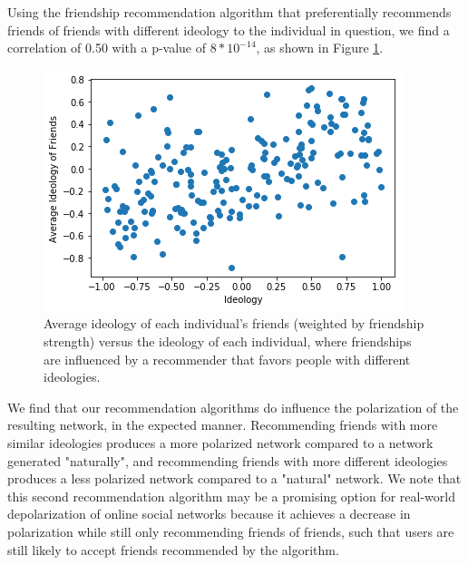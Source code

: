 \documentclass[12pt,letterpaper]{article}
\begin{document}
Using the friendship recommendation algorithm that preferentially recommends friends of friends with different ideology to the individual in question, we find a correlation of 0.50 with a p-value of $8*10^{-14}$, as shown in Figure \ref{fig:depolar}.

\begin{figure}[htbp!]
	\includegraphics[width=\linewidth]{depolar_intervention.png}
	\caption{Average ideology of each individual's friends (weighted by friendship strength) versus the ideology of each individual, where friendships are influenced by a recommender that favors people with different ideologies.}
	\label{fig:depolar}
\end{figure}

We find that our recommendation algorithms do influence the polarization of the resulting network, in the expected manner. Recommending friends with more similar ideologies produces a more polarized network compared to a network generated "naturally", and recommending friends with more different ideologies produces a less polarized network compared to a "natural" network. We note that this second recommendation algorithm may be a promising option for real-world depolarization of online social networks because it achieves a decrease in polarization while still only recommending friends of friends, such that users are still likely to accept friends recommended by the algorithm.
\end{document}
